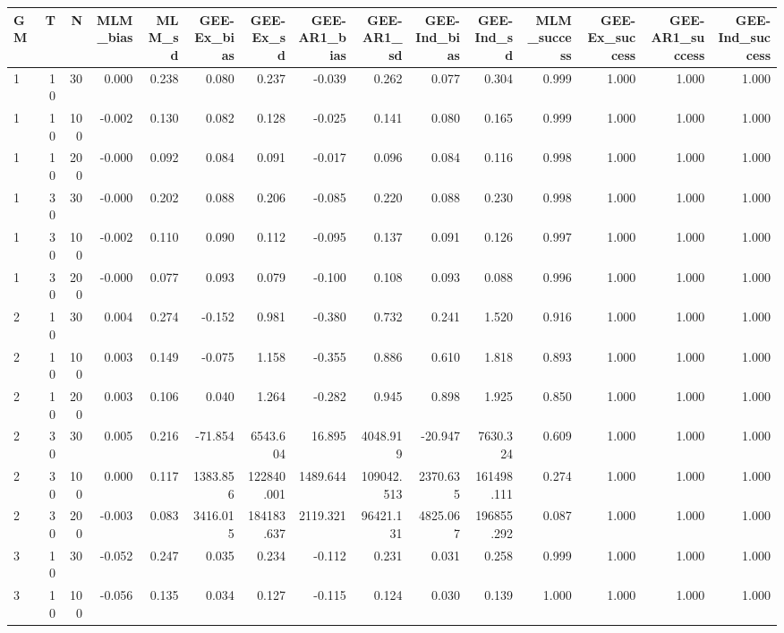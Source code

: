 \begin{table}[ht]
\centering
\begin{tabular}{lrrrrrrrrrrrrrr}
  \hline
GM & T & N & MLM\_bias & MLM\_sd & GEE-Ex\_bias & GEE-Ex\_sd & GEE-AR1\_bias & GEE-AR1\_sd & GEE-Ind\_bias & GEE-Ind\_sd & MLM\_success & GEE-Ex\_success & GEE-AR1\_success & GEE-Ind\_success \\ 
  \hline
1 & 10 & 30 & 0.000 & 0.238 & 0.080 & 0.237 & -0.039 & 0.262 & 0.077 & 0.304 & 0.999 & 1.000 & 1.000 & 1.000 \\ 
  1 & 10 & 100 & -0.002 & 0.130 & 0.082 & 0.128 & -0.025 & 0.141 & 0.080 & 0.165 & 0.999 & 1.000 & 1.000 & 1.000 \\ 
  1 & 10 & 200 & -0.000 & 0.092 & 0.084 & 0.091 & -0.017 & 0.096 & 0.084 & 0.116 & 0.998 & 1.000 & 1.000 & 1.000 \\ 
  1 & 30 & 30 & -0.000 & 0.202 & 0.088 & 0.206 & -0.085 & 0.220 & 0.088 & 0.230 & 0.998 & 1.000 & 1.000 & 1.000 \\ 
  1 & 30 & 100 & -0.002 & 0.110 & 0.090 & 0.112 & -0.095 & 0.137 & 0.091 & 0.126 & 0.997 & 1.000 & 1.000 & 1.000 \\ 
  1 & 30 & 200 & -0.000 & 0.077 & 0.093 & 0.079 & -0.100 & 0.108 & 0.093 & 0.088 & 0.996 & 1.000 & 1.000 & 1.000 \\ 
  2 & 10 & 30 & 0.004 & 0.274 & -0.152 & 0.981 & -0.380 & 0.732 & 0.241 & 1.520 & 0.916 & 1.000 & 1.000 & 1.000 \\ 
  2 & 10 & 100 & 0.003 & 0.149 & -0.075 & 1.158 & -0.355 & 0.886 & 0.610 & 1.818 & 0.893 & 1.000 & 1.000 & 1.000 \\ 
  2 & 10 & 200 & 0.003 & 0.106 & 0.040 & 1.264 & -0.282 & 0.945 & 0.898 & 1.925 & 0.850 & 1.000 & 1.000 & 1.000 \\ 
  2 & 30 & 30 & 0.005 & 0.216 & -71.854 & 6543.604 & 16.895 & 4048.919 & -20.947 & 7630.324 & 0.609 & 1.000 & 1.000 & 1.000 \\ 
  2 & 30 & 100 & 0.000 & 0.117 & 1383.856 & 122840.001 & 1489.644 & 109042.513 & 2370.635 & 161498.111 & 0.274 & 1.000 & 1.000 & 1.000 \\ 
  2 & 30 & 200 & -0.003 & 0.083 & 3416.015 & 184183.637 & 2119.321 & 96421.131 & 4825.067 & 196855.292 & 0.087 & 1.000 & 1.000 & 1.000 \\ 
  3 & 10 & 30 & -0.052 & 0.247 & 0.035 & 0.234 & -0.112 & 0.231 & 0.031 & 0.258 & 0.999 & 1.000 & 1.000 & 1.000 \\ 
  3 & 10 & 100 & -0.056 & 0.135 & 0.034 & 0.127 & -0.115 & 0.124 & 0.030 & 0.139 & 1.000 & 1.000 & 1.000 & 1.000 \\ 

\end{tabular}
\end{table}
